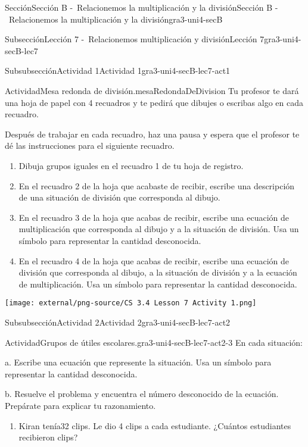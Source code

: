 \documentclass[twoside,10pt,]{article}
\begin{document}
\begin{sectionptx}{Sección}{Sección B -~Relacionemos la multiplicación y la división}{}{Sección B -~Relacionemos la multiplicación y la división}{}{}{gra3-uni4-secB}
\begin{subsectionptx}{Subsección}{Lección 7 -~Relacionemos multiplicación y división}{}{Lección 7}{}{}{gra3-uni4-secB-lec7}
\begin{subsubsectionptx}{Subsubsección}{Actividad 1}{}{Actividad 1}{}{}{gra3-uni4-secB-lec7-act1}
\begin{activity}{Actividad}{Mesa redonda de división.}{mesaRedondaDeDivision}%
Tu profesor te dará una hoja de papel con 4 recuadros y te pedirá que dibujes o escribas algo en cada recuadro.%
\par
Después de trabajar en cada recuadro, haz una pausa y espera que el profesor te dé las instrucciones para el siguiente recuadro.%
%
\begin{enumerate}
\item{}Dibuja grupos iguales en el recuadro 1 de tu hoja de registro.%
\item{}En el recuadro 2 de la hoja que acabaste de recibir, escribe una descripción de una situación de división que corresponda al dibujo.%
\item{}En el recuadro 3 de la hoja que acabas de recibir, escribe una ecuación de multiplicación que corresponda al dibujo y a la situación de división. Usa un símbolo para representar la cantidad desconocida.%
\item{}En el recuadro 4 de la hoja que acabas de recibir, escribe una ecuación de división que corresponda al dibujo, a la situación de división y a la ecuación de multiplicación. Usa un símbolo para representar la cantidad desconocida.%
\end{enumerate}
\begin{image}{0.2}{0.6}{0.2}{}%
\texttt{[image: external/png-source/CS 3.4 Lesson 7 Activity 1.png]}
\end{image}%
\end{activity}%
\end{subsubsectionptx}
%
%
\typeout{************************************************}
\typeout{************************************************}
%
\begin{subsubsectionptx}{Subsubsección}{Actividad 2}{}{Actividad 2}{}{}{gra3-uni4-secB-lec7-act2}
\begin{activity}{Actividad}{Grupos de útiles escolares.}{gra3-uni4-secB-lec7-act2-3}%
En cada situación:%
\par
a. Escribe una ecuación que represente la situación. Usa un símbolo para representar la cantidad desconocida.%
\par
b. Resuelve el problema y encuentra el número desconocido de la ecuación. Prepárate para explicar tu razonamiento.%
%
\begin{enumerate}
\item{}Kiran tenía32 clips. Le dio 4 clips a cada estudiante. ¿Cuántos estudiantes recibieron clips?%

\end{enumerate}
\end{activity}
\end{subsubsectionptx}
\end{subsectionptx}
\end{sectionptx}
\end{document}
